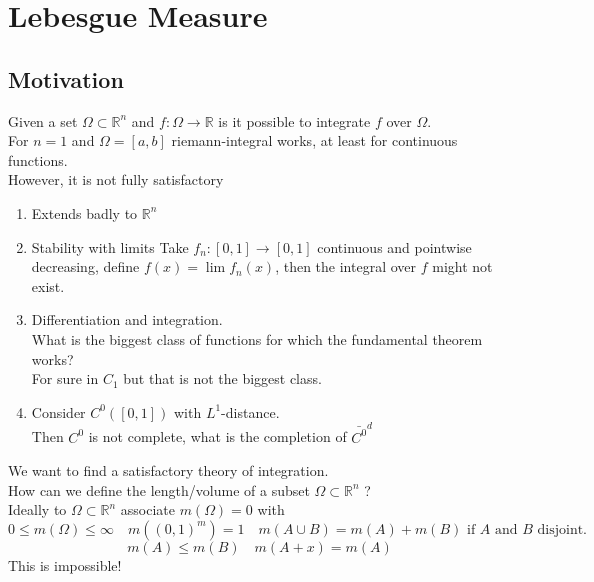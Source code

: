 \documentclass[../main.tex]{subfiles}
\begin{document}
\section{Lebesgue Measure}
\subsection*{Motivation}
Given a set $\Omega \subset \mathbb{R}^n $ and $f:\Omega\to \mathbb{R}$ is it possible to integrate $f$ over $\Omega$.\\
For $n=1$ and $\Omega= [ a,b] $ riemann-integral works, at least for continuous functions.\\
However, it is not fully satisfactory
\begin{enumerate}
\item Extends badly to $ \mathbb{R}^n$ 
\item Stability with limits
	Take $f_n: [ 0,1] \to [ 0,1] $ continuous and pointwise decreasing, define $f( x) = \lim f_n( x) $, then the integral over $f$ might not exist.
\item Differentiation and integration.\\
	What is the biggest class of functions for which the fundamental theorem works?\\
	For sure in $C_1$ but that is not the biggest class.
\item Consider $C^{0}( [ 0,1] ) $ with $L^{1}$-distance.\\
	Then $C^{0}$ is not complete, what is the completion of $\bar{C^{0}}^{d}$
\end{enumerate}
We want to find a satisfactory theory of integration.\\
How can we define the length/volume of a subset $\Omega \subset \mathbb{R}^n$ ?\\
Ideally to $\Omega \subset \mathbb{R}^n$ associate $m( \Omega) =0$ with
\[ 
0 \leq m( \Omega) \leq \infty \quad m( ( 0,1) ^{m}) =1 \quad m( A\cup B) =m( A) +m( B) \text{ if $A$ and $B$ disjoint. }
\]
\[ 
m( A) \leq m( B) \quad m( A+x) =m( A) 
\]
This is impossible!
\end{document}
